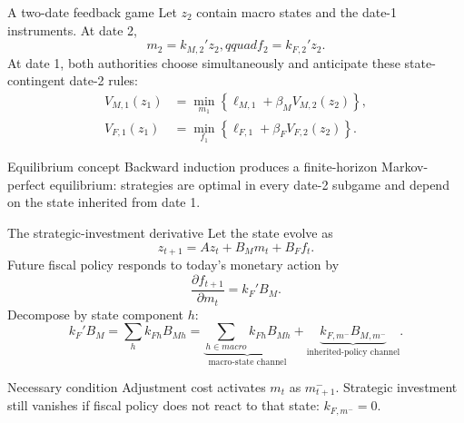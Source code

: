 \documentclass[10pt,aspectratio=169]{beamer}
\begin{document}
\begin{frame}{A two-date feedback game}
Let $z_2$ contain macro states and the date-1 instruments. At date 2,
\begin{equation*}
m_2=k_{M,2}'z_2,qquad f_2=k_{F,2}'z_2.
\end{equation*}
At date 1, both authorities choose simultaneously and anticipate these
state-contingent date-2 rules:
\begin{align*}
V_{M,1}(z_1)&=\min_{m_1}\left\{\ell_{M,1}
            +\beta_MV_{M,2}(z_2)\right\},\\
V_{F,1}(z_1)&=\min_{f_1}\left\{\ell_{F,1}
            +\beta_FV_{F,2}(z_2)\right\}.
\end{align*}
\begin{alertblock}{Equilibrium concept}
Backward induction produces a finite-horizon Markov-perfect equilibrium:
strategies are optimal in every date-2 subgame and depend on the state inherited
from date 1.
\end{alertblock}
\end{frame}

\begin{frame}{The strategic-investment derivative}
Let the state evolve as
\begin{equation*}
z_{t+1}=Az_t+B_Mm_t+B_Ff_t.
\end{equation*}
Future fiscal policy responds to today's monetary action by
\begin{equation*}
\boxed{\frac{\partial f_{t+1}}{\partial m_t}=k_F'B_M.}
\end{equation*}
Decompose by state component $h$:
\begin{equation*}
k_F'B_M=\sum_h k_{Fh}B_{Mh}
=\underbrace{\sum_{h\in macro}k_{Fh}B_{Mh}}_{\text{macro-state channel}}
+\underbrace{k_{F,m^-}B_{M,m^-}}_{\text{inherited-policy channel}}.
\end{equation*}
\begin{alertblock}{Necessary condition}
Adjustment cost activates $m_t$ as $m_{t+1}^{-}$. Strategic investment still
vanishes if fiscal policy does not react to that state: $k_{F,m^-}=0$.
\end{alertblock}
\end{frame}
\end{document}
